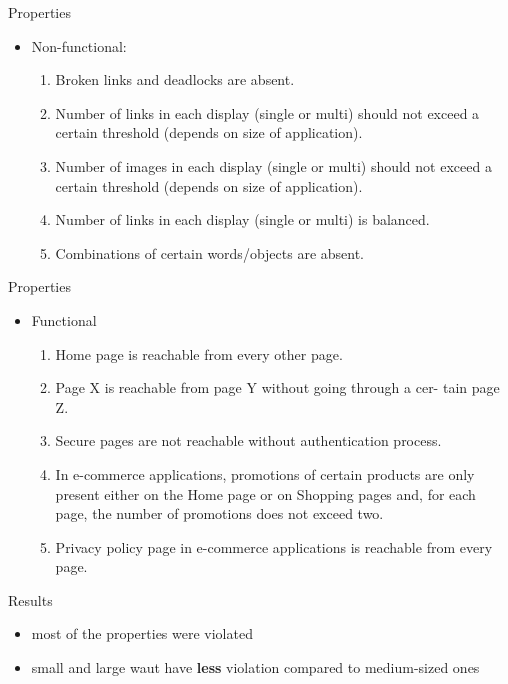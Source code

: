 \documentclass[usenames,dvipsnames]{beamer}
\theoremstyle{definition}
\begin{document}
\begin{frame}{Properties}
  \begin{itemize}
    \item Non-functional:
      \begin{enumerate}
        \item Broken links and deadlocks are absent.
        \item Number of links in each display (single or multi) should not exceed a certain threshold (depends on size of application).
        \item Number of images in each display (single or multi) should not exceed a certain threshold (depends on size of application).
        \item Number of links in each display (single or multi) is balanced.
        \item Combinations of certain words/objects are absent.
      \end{enumerate}
  \end{itemize}
\end{frame}

\begin{frame}{Properties}
  \begin{itemize}
    \item Functional 
      \begin{enumerate}
        \item Home page is reachable from every other page.
        \item Page X is reachable from page Y without going through a cer- tain page Z.
        \item Secure pages are not reachable without authentication process.
        \item In e-commerce applications, promotions of certain products are only present either on the Home page or on Shopping pages and, for each page, the number of promotions does not exceed two.
        \item Privacy policy page in e-commerce applications is reachable from every page.
      \end{enumerate}
  \end{itemize}
\end{frame}

\begin{frame}{Results}
  \begin{itemize}
    \item most of the properties were violated
    \item small and large \gls{waut} have \textbf{less} violation compared to medium-sized ones
  \end{itemize}
\end{frame}
\end{document}
